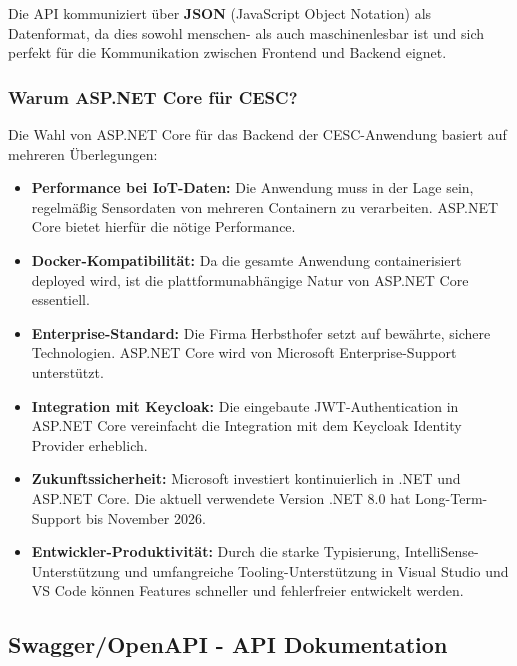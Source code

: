 Die API kommuniziert über \textbf{JSON} (JavaScript Object Notation) als Datenformat, da dies sowohl menschen- als auch maschinenlesbar ist und sich perfekt für die Kommunikation zwischen Frontend und Backend eignet.

\subsubsection{Warum ASP.NET Core für CESC?}

Die Wahl von ASP.NET Core für das Backend der CESC-Anwendung basiert auf mehreren Überlegungen:

\begin{itemize}
    \item \textbf{Performance bei IoT-Daten:} Die Anwendung muss in der Lage sein, regelmäßig Sensordaten von mehreren Containern zu verarbeiten. ASP.NET Core bietet hierfür die nötige Performance.
    
    \item \textbf{Docker-Kompatibilität:} Da die gesamte Anwendung containerisiert deployed wird, ist die plattformunabhängige Natur von ASP.NET Core essentiell.
    
    \item \textbf{Enterprise-Standard:} Die Firma Herbsthofer setzt auf bewährte, sichere Technologien. ASP.NET Core wird von Microsoft Enterprise-Support unterstützt.
    
    \item \textbf{Integration mit Keycloak:} Die eingebaute JWT-Authentication in ASP.NET Core vereinfacht die Integration mit dem Keycloak Identity Provider erheblich.
    
    \item \textbf{Zukunftssicherheit:} Microsoft investiert kontinuierlich in .NET und ASP.NET Core. Die aktuell verwendete Version .NET 8.0 hat Long-Term-Support bis November 2026.
    
    \item \textbf{Entwickler-Produktivität:} Durch die starke Typisierung, IntelliSense-Unterstützung und umfangreiche Tooling-Unterstützung in Visual Studio und VS Code können Features schneller und fehlerfreier entwickelt werden.
\end{itemize}

\subsection{Swagger/OpenAPI - API Dokumentation}

